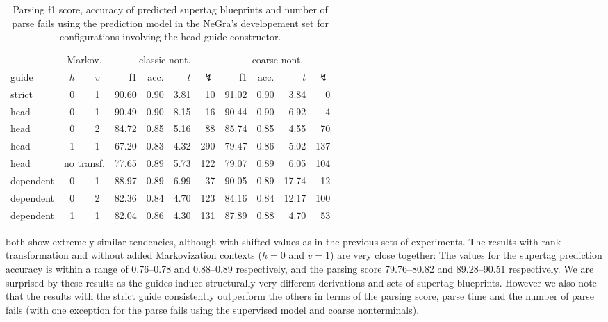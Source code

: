 \documentclass[../../document.tex]{subfiles}
\begin{document}
    \begin{table}
        \caption{\label{tbl:gridsearch:head:3}
        Parsing f1 score, accuracy of predicted supertag blueprints and number of parse fails using the  prediction model in the NeGra's developement set for configurations involving the head guide constructor.
        }
        \centering
        \vspace{.2cm}
        \begin{tabular}{lcc|rrrr|rrrr}
            \toprule
                    & \multicolumn{2}{c|}{Markov.} & \multicolumn{4}{c|}{classic nont.} &  \multicolumn{4}{c}{coarse nont.} \\
                    guide           & \(h\) & \(v\) & f1 & acc. & $t$ & $\lightning$ & f1 & acc. & $t$ & $\lightning$  \\ \hline \rowcolor{black!10}
strict         & 0 & 1 & 90.60 & 0.90 & 3.81 & 10 & 91.02 & 0.90 & 3.84 & 0 \\\hline
head & 0 & 1 & 90.49 & 0.90 & 8.15 & 16 & 90.44 & 0.90 & 6.92 & 4 \\
head & 0 & 2 & 84.72 & 0.85 & 5.16 & 88 & 85.74 & 0.85 & 4.55 & 70 \\
head & 1 & 1 & 67.20 & 0.83 & 4.32 & 290 & 79.47 & 0.86 & 5.02 & 137 \\
head & \multicolumn{2}{c|}{no transf.}  & 77.65 & 0.89 & 5.73 & 122 & 79.07 & 0.89 & 6.05 & 104 \\\hline
dependent & 0 & 1 & 88.97 & 0.89 & 6.99 & 37 & 90.05 & 0.89 & 17.74 & 12 \\
dependent & 0 & 2 & 82.36 & 0.84 & 4.70 & 123 & 84.16 & 0.84 & 12.17 & 100 \\
dependent & 1 & 1 & 82.04 & 0.86 & 4.30 & 131 & 87.89 & 0.88 & 4.70 & 53 \\
\bottomrule
        \end{tabular}
    \end{table}

     both show extremely similar tendencies, although with shifted values as in the previous sets of experiments.
    The results with rank transformation and without added Markovization contexts ($h=0$ and $v=1$) are very close together:
        The values for the supertag prediction accuracy is within a range of 0.76--0.78 and 0.88--0.89 respectively, and the parsing score 79.76--80.82 and 89.28--90.51 respectively.
    We are surprised by these results as the guides induce structurally very different derivations and sets of supertag blueprints.
    However we also note that the results with the strict guide consistently outperform the others in terms of the parsing score, parse time and the number of parse fails (with one exception for the parse fails using the supervised model and coarse nonterminals).
\end{document}
